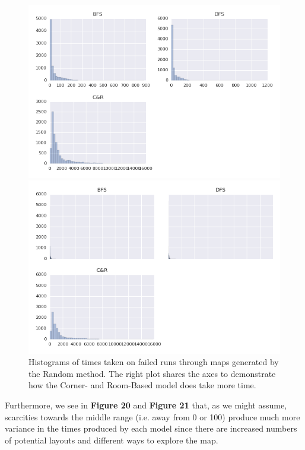 \documentclass[12pt]{article}
\begin{document}
\begin{figure}[htbp]
\begin{minipage}{.48\linewidth}
\centering
\includegraphics[width=1\linewidth]{TimeHistRandomFailed.png} 
\end{minipage}
\begin{minipage}{.48\linewidth}
\centering
\includegraphics[width=1\linewidth]{TimeHistRandomFailedShare.png} 
\end{minipage}
\caption{Histograms of times taken on failed runs through maps generated by the Random method. The right plot shares the axes to demonstrate how the Corner- and Room-Based model does take more time.}
\end{figure} 

Furthermore, we see in \textbf{Figure 20} and \textbf{Figure 21} that, as we might assume, scarcities towards the middle range (i.e. away from 0 or 100) produce much more variance in the times produced by each model since there are increased numbers of potential layouts and different ways to explore the map. 
\end{document}
